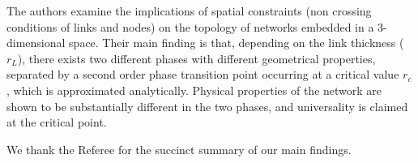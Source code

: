 \documentclass[11pt]{article}
\begin{document}
\begin{response}

\end{response}

\newpage

\begin{response}{The authors examine the implications of spatial constraints (non crossing conditions of links and nodes) on the topology of networks embedded in a 3-dimensional space. 
Their main finding is that, depending on the link thickness ($r_L$), there exists two different phases with different geometrical properties, separated by a second order phase transition point occurring at a critical value $r_c$, which is approximated analytically. 
Physical properties of the network are shown to be substantially different in the two phases, and universality is claimed at the critical point. 
}

We thank the Referee for the succinct summary of our main findings. 
\end{response}
\end{document}
